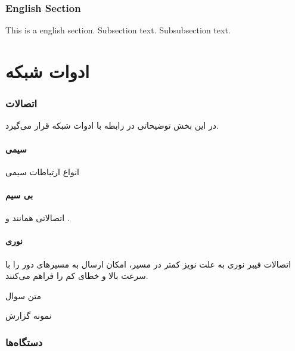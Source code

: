 \documentclass{../UTNetLabFa}
\begin{document}
\begin{otherlanguage}{english}
	\section{English Section}
	This is a english section.%
	Subsection text.
	Subsubsection text.
\end{otherlanguage}

\part{ادوات شبکه}
\section{اتصالات}
در این بخش توضیحاتی در رابطه با ادوات شبکه قرار می‌گیرد.
\subsection{سیمی}
انواع ارتباطات سیمی

\subsection{بی سیم}
	اتصالاتی همانند  و .
\subsection{نوری}
    اتصالات فیبر نوری به علت نویز کمتر در مسیر، امکان ارسال به مسیرهای دور را با سرعت بالا و خطای کم را فراهم می‌کنند.
\begin{question}
    \item متن سوال
\end{question}

\begin{report}
	\item نمونه گزارش
\end{report}

\section{دستگاه‌ها}
\end{document}
